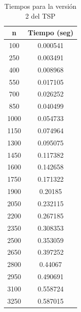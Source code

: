 \documentclass{article}
\begin{document}
\begin{table}[htbp]
    \centering
    \begin{tabular}{cc} %
        \toprule
        n  & Tiempo (seg) \\
        \midrule
        100 & 0.000541 \\
        250 & 0.003491 \\
        400 & 0.008968 \\
        550 & 0.017105 \\
        700 & 0.026252 \\
        850 & 0.040499 \\
        1000 & 0.054733 \\
        1150 & 0.074964 \\
        1300 & 0.095075 \\
        1450 & 0.117382 \\
        1600 & 0.142658 \\
        1750 & 0.171322 \\
        1900 & 0.20185 \\
        2050 & 0.232115 \\
        2200 & 0.267185 \\
        2350 & 0.308353 \\
        2500 & 0.353059 \\
        2650 & 0.397252 \\
        2800 & 0.44067 \\
        2950 & 0.490691 \\
        3100 & 0.558724 \\
        3250 & 0.587015 \\
        \bottomrule
    \end{tabular}
    \caption{Tiempos para la versión 2 del TSP}
    \label{tab:time_v2_p4}
\end{table}
\end{document}
